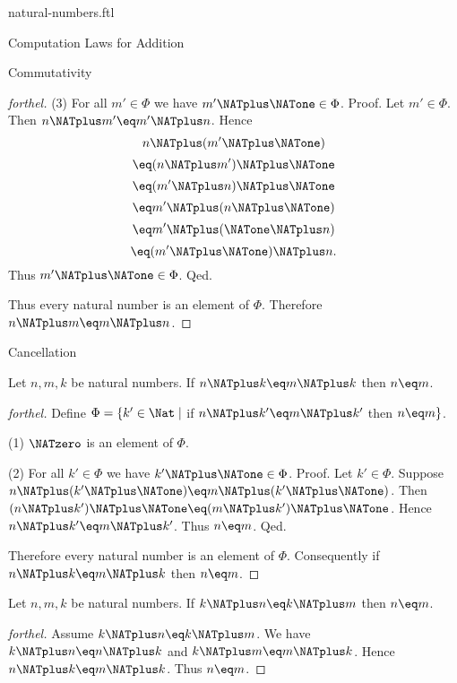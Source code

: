 \documentclass{naproche-library}
\begin{document}
\begin{smodule}[title=Natural Numbers]{natural-numbers.ftl}
\begin{sfragment}{Computation Laws for Addition}
\begin{sfragment}{Commutativity}
\begin{proof}[forthel]
      (3) For all $m' \in \Phi$ we have $m' \NATplus \NATone \in \Phi$. \newline
      Proof.
        Let $m' \in \Phi$.
        Then $n \NATplus m' \eq m' \NATplus n$.
        Hence
        \[  n \NATplus (m'  \NATplus \NATone)       \]
        \[    \eq (n \NATplus m') \NATplus \NATone    \]
        \[    \eq (m' \NATplus n) \NATplus \NATone    \]
        \[    \eq m' \NATplus (n \NATplus \NATone)    \]
        \[    \eq m' \NATplus (\NATone \NATplus n)    \]
        \[    \eq (m' \NATplus \NATone) \NATplus n.   \]
        Thus $m' \NATplus \NATone \in \Phi$.
      Qed.

      Thus every natural number is an element of $\Phi$.
      Therefore $n \NATplus m \eq m \NATplus n$.
    \end{proof}
  \end{sfragment}

  \begin{sfragment}{Cancellation}
    \begin{proposition}[forthel,id=ARITHMETIC_03_3137702874578944]
      Let $n, m, k$ be natural numbers.
      If $n \NATplus k \eq m \NATplus k$ then $n \eq m$.
    \end{proposition}
    \begin{proof}[forthel]
      Define $\Phi = \{ k' \in \Nat \mid$ if $n \NATplus k' \eq m \NATplus k'$ then $n \eq m \}$.

      (1) $\NATzero$ is an element of $\Phi$.

      (2) For all $k' \in \Phi$ we have $k' \NATplus \NATone \in \Phi$. \newline
      Proof.
        Let $k' \in \Phi$.
        Suppose $n \NATplus (k' \NATplus \NATone) \eq m \NATplus (k' \NATplus \NATone)$.
        Then $(n \NATplus k') \NATplus \NATone \eq (m \NATplus k') \NATplus \NATone$.
        Hence $n \NATplus k' \eq m \NATplus k'$.
        Thus $n \eq m$.
      Qed.

      Therefore every natural number is an element of $\Phi$.
      Consequently if $n \NATplus k \eq m \NATplus k$ then $n \eq m$.
    \end{proof}

    \begin{corollary}[forthel,id=ARITHMETIC_03_8445946379632640]
      Let $n, m, k$ be natural numbers.
      If $k \NATplus n \eq k \NATplus m$ then $n \eq m$.
    \end{corollary}
    \begin{proof}[forthel]
      Assume $k \NATplus n \eq k \NATplus m$.
      We have $k \NATplus n \eq n \NATplus k$ and $k \NATplus m \eq m \NATplus k$.
      Hence $n \NATplus k \eq m \NATplus k$.
      Thus $n \eq m$.
    \end{proof}
  \end{sfragment}


\end{sfragment}
\end{smodule}
\end{document}
